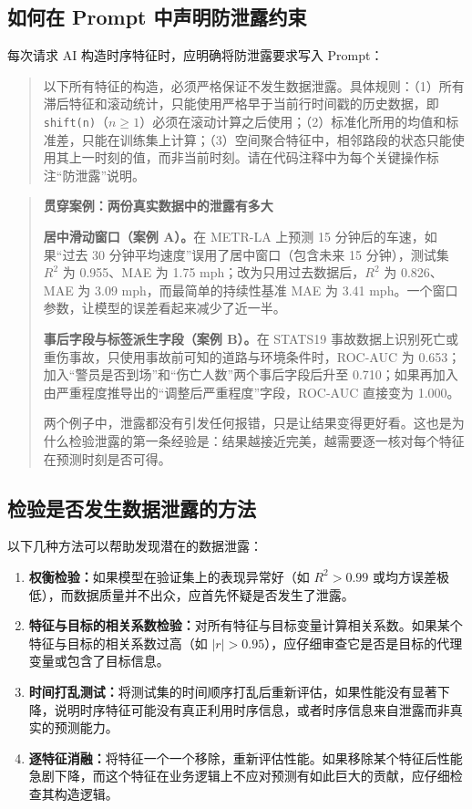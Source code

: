 \subsection{如何在 Prompt 中声明防泄露约束}

每次请求 AI 构造时序特征时，应明确将防泄露要求写入 Prompt：

\begin{quote}
以下所有特征的构造，必须严格保证不发生数据泄露。具体规则：（1）所有滞后特征和滚动统计，只能使用严格早于当前行时间戳的历史数据，即 \texttt{shift(n)}（$n \geq 1$）必须在滚动计算之后使用；（2）标准化所用的均值和标准差，只能在训练集上计算；（3）空间聚合特征中，相邻路段的状态只能使用其上一时刻的值，而非当前时刻。请在代码注释中为每个关键操作标注“防泄露”说明。
\end{quote}

\begin{quote}
\textbf{贯穿案例：两份真实数据中的泄露有多大}

\textbf{居中滑动窗口（案例 A）。}在 METR-LA 上预测 15 分钟后的车速，如果“过去 30 分钟平均速度”误用了居中窗口（包含未来 15 分钟），测试集 $R^2$ 为 0.955、MAE 为 1.75 mph；改为只用过去数据后，$R^2$ 为 0.826、MAE 为 3.09 mph，而最简单的持续性基准 MAE 为 3.41 mph。一个窗口参数，让模型的误差看起来减少了近一半。

\textbf{事后字段与标签派生字段（案例 B）。}在 STATS19 事故数据上识别死亡或重伤事故，只使用事故前可知的道路与环境条件时，ROC-AUC 为 0.653；加入“警员是否到场”和“伤亡人数”两个事后字段后升至 0.710；如果再加入由严重程度推导出的“调整后严重程度”字段，ROC-AUC 直接变为 1.000。

两个例子中，泄露都没有引发任何报错，只是让结果变得更好看。这也是为什么检验泄露的第一条经验是：结果越接近完美，越需要逐一核对每个特征在预测时刻是否可得。
\end{quote}

\subsection{检验是否发生数据泄露的方法}

以下几种方法可以帮助发现潜在的数据泄露：

\begin{enumerate}
  \item \textbf{权衡检验：}如果模型在验证集上的表现异常好（如 $R^2 > 0.99$ 或均方误差极低），而数据质量并不出众，应首先怀疑是否发生了泄露。
  \item \textbf{特征与目标的相关系数检验：}对所有特征与目标变量计算相关系数。如果某个特征与目标的相关系数过高（如 $|r| > 0.95$），应仔细审查它是否是目标的代理变量或包含了目标信息。
  \item \textbf{时间打乱测试：}将测试集的时间顺序打乱后重新评估，如果性能没有显著下降，说明时序特征可能没有真正利用时序信息，或者时序信息来自泄露而非真实的预测能力。
  \item \textbf{逐特征消融：}将特征一个一个移除，重新评估性能。如果移除某个特征后性能急剧下降，而这个特征在业务逻辑上不应对预测有如此巨大的贡献，应仔细检查其构造逻辑。
\end{enumerate}


